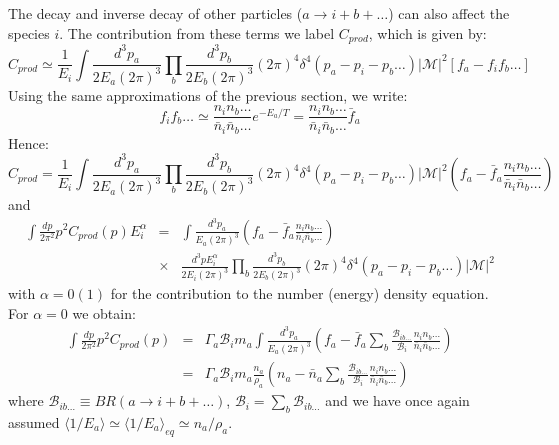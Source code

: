 \documentclass[preprint,notoc]{JHEP3}
\def\to{\rightarrow}
\def\to{\rightarrow}
\begin{document}
The decay and inverse decay of other particles ($a \to i + b + \ldots$) can also
affect the species $i$. The contribution from these terms we label $C_{prod}$, which is given
by\cite{kawasaki0}:
\begin{equation}
C_{prod} \simeq \frac{1}{E_i} \int \frac{d^3 p_a}{2 E_a (2
\pi)^3} \prod_{b} \frac{d^3 p_b}{2 E_b (2 \pi)^3} (2 \pi)^4 \delta^{4}\left(p_a
- p_i - p_b \ldots\right) |\mathcal{M}|^2 \left[f_a - f_i f_b \ldots \right]
\end{equation}
Using the same approximations of the previous section, we write:
\begin{equation}
f_i f_b\ldots \simeq  \frac{n_i n_b \ldots}{\bar{n}_i \bar{n}_b \ldots}
e^{-E_a/T} = \frac{n_i n_b \ldots}{\bar{n}_i \bar{n}_b \ldots}
\bar{f}_{a}
\end{equation} 
Hence:
\begin{equation}
C_{prod} = \frac{1}{E_i} \int \frac{d^3 p_a}{2 E_a (2 \pi)^3} \prod_{b} \frac{d^3 p_b}{2 E_b (2 \pi)^3} 
(2 \pi)^4 \delta^{4}\left(p_a - p_i - p_b \ldots\right) |\mathcal{M}|^2
\left(f_a - \bar{f}_a \frac{n_i n_b \ldots}{\bar{n}_i
\bar{n}_b \ldots} \right)
\end{equation}
and
\begin{eqnarray}
\int \frac{dp}{2 \pi^2} p^2 C_{prod}(p) E_i^\alpha & = & 
\int \frac{d^3 p_a}{E_a (2 \pi)^3} \left(f_a - \bar{f}_a \frac{n_i n_b \ldots}{\bar{n}_i
\bar{n}_b \ldots} \right) \nonumber \\
& \times & \frac{d^3 p E_i^{\alpha}}{2 E_i (2 \pi)^3}
\prod_{b} \frac{d^3 p_b}{2 E_b (2 \pi)^3} (2 \pi)^4 \delta^{4}\left(p_a - p_i - p_b \ldots\right) |\mathcal{M}|^2
\label{eq:prod2}
\end{eqnarray}
with $\alpha = 0 (1)$ for the contribution to the number (energy) density equation.
For $\alpha = 0$ we obtain:
\begin{eqnarray}
\int \frac{dp}{2 \pi^2} p^2 C_{prod}(p) & = & \Gamma_a  \mathcal{B}_{i} m_a 
\int \frac{d^3 p_a}{E_a (2 \pi)^3} \left(f_a - \bar{f}_a \sum_b
\frac{\mathcal{B}_{ib\ldots}}{\mathcal{B}_{i}}\frac{n_i n_b \ldots}{\bar{n}_i
\bar{n}_b \ldots} \right)
\nonumber
\\
& = & \Gamma_a \mathcal{B}_{i} m_a \frac{n_a}{\rho_a} \left( n_a - \bar{n}_a
  \sum_b \frac{\mathcal{B}_{ib\ldots}}{\mathcal{B}_{i}} \frac{n_i n_b
  \ldots}{\bar{n}_i \bar{n}_b \ldots} \right)
\end{eqnarray}
where $\mathcal{B}_{ib\ldots} \equiv BR(a \to i + b + \ldots)$, $\mathcal{B}_i
= \sum_{b} \mathcal{B}_{ib\ldots}$ and we have once again assumed $\langle 1/E_a
\rangle \simeq \langle 1/E_a \rangle_{eq} \simeq n_a/\rho_a$.
\end{document}
